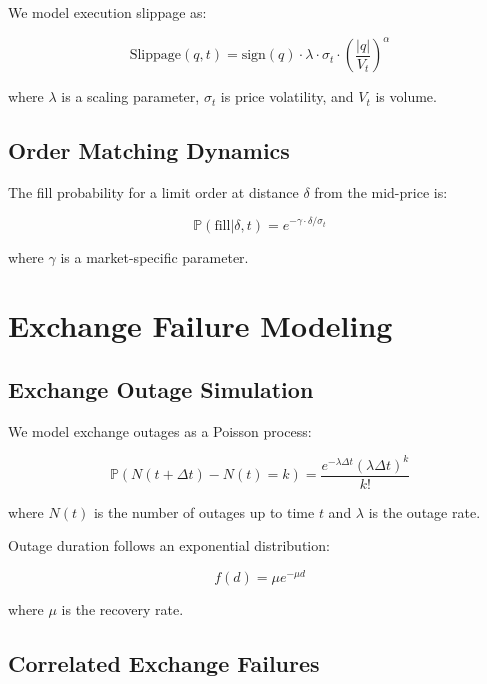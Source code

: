 \documentclass{article}
\begin{document}
We model execution slippage as:

\begin{equation}
\text{Slippage}(q, t) = \text{sign}(q) \cdot \lambda \cdot \sigma_t \cdot \left(\frac{|q|}{V_t}\right)^{\alpha}
\end{equation}

where $\lambda$ is a scaling parameter, $\sigma_t$ is price volatility, and $V_t$ is volume.

\subsection{Order Matching Dynamics}

The fill probability for a limit order at distance $\delta$ from the mid-price is:

\begin{equation}
\mathbb{P}(\text{fill} | \delta, t) = e^{-\gamma \cdot \delta / \sigma_t}
\end{equation}

where $\gamma$ is a market-specific parameter.

\section{Exchange Failure Modeling}

\subsection{Exchange Outage Simulation}

We model exchange outages as a Poisson process:

\begin{equation}
\mathbb{P}(N(t+\Delta t) - N(t) = k) = \frac{e^{-\lambda \Delta t} (\lambda \Delta t)^k}{k!}
\end{equation}

where $N(t)$ is the number of outages up to time $t$ and $\lambda$ is the outage rate.

Outage duration follows an exponential distribution:

\begin{equation}
f(d) = \mu e^{-\mu d}
\end{equation}

where $\mu$ is the recovery rate.

\subsection{Correlated Exchange Failures}
\end{document}
